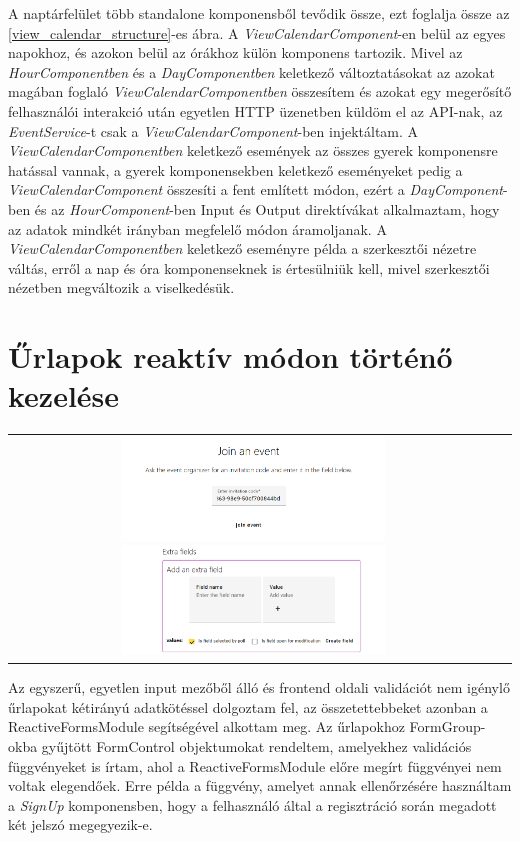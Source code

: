 \documentclass[a4paper,12pt]{report}
\theoremstyle{definition}
\theoremstyle{remark}
\begin{document}
A naptárfelület több standalone komponensből tevődik össze, ezt foglalja össze az \ref{view_calendar_structure}-es ábra. A \textit{ViewCalendarComponent}-en belül az egyes napokhoz, és azokon belül az órákhoz külön komponens tartozik. Mivel az \textit{HourComponentben} és a\textit{ DayComponentben} keletkező változtatásokat az azokat magában foglaló \textit{ViewCalendarComponentben} összesítem és azokat egy megerősítő felhasználói interakció után egyetlen HTTP üzenetben küldöm el az API-nak, az \textit{EventService}-t csak a \textit{ViewCalendarComponent}-ben injektáltam. A \textit{ViewCalendarComponentben} keletkező események az összes gyerek komponensre hatással vannak, a gyerek komponensekben keletkező eseményeket pedig a \textit{ViewCalendarComponent} összesíti a fent említett módon, ezért a \textit{DayComponent}-ben és az \textit{HourComponent}-ben Input és Output direktívákat alkalmaztam, hogy az adatok mindkét irányban megfelelő módon áramoljanak. A \textit{ViewCalendarComponentben} keletkező eseményre példa a szerkesztői nézetre váltás, erről a nap és óra komponenseknek is értesülniük kell, mivel szerkesztői nézetben megváltozik a viselkedésük.

\section{Űrlapok reaktív módon történő kezelése}

\begin{center}
\begin{tabular}{cc}
\includegraphics[width=70mm]{join_event}
\includegraphics[width=70mm]{extra_field_form}
\end{tabular}
\captionsetup{width=0.8\linewidth}
\end{center}

Az egyszerű, egyetlen input mezőből álló és frontend oldali validációt nem igénylő űrlapokat kétirányú adatkötéssel dolgoztam fel, az összetettebbeket azonban a ReactiveFormsModule\cite{ReactiveFormswebsite} segítségével alkottam meg. Az űrlapokhoz FormGroup-okba gyűjtött FormControl objektumokat rendeltem, amelyekhez validációs függvényeket is írtam, ahol a ReactiveFormsModule előre megírt függvényei nem voltak elegendőek. Erre példa a függvény, amelyet annak ellenőrzésére használtam a  \textit{SignUp} komponensben, hogy a felhasználó által a regisztráció során megadott két jelszó megegyezik-e.
\end{document}
